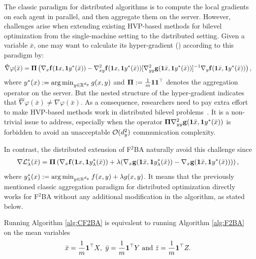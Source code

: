 The classic paradigm for distributed algorithms is to compute the local gradients on each agent in parallel, and then aggregate them on the server. 
However, challenges arise when extending existing HVP-based methods for bilevel optimization from the single-machine setting to the distributed setting. Given a variable $\bar x$, one may want to calculate its hyper-gradient () according to this paradigm by:
\begin{align*}
    \hat \nabla \varphi(\bar x) = {\bf \Pi} \left( \nabla_x {\bf{f}}({\bf{1}} x, {\bf{1}} y^*(\bar x)) - \nabla_{xy}^2 {\bf{f}}({\bf{1}} x,{\bf{1}} y^*(\bar x)) [\nabla_{yy}^2 {\bf{g}}({\bf{1}} \bar x, {\bf{1}} y^*(\bar x))]^{-1} \nabla_y {\bf{f}}({\bf{1}} \bar x, {\bf{1}} y^*(\bar x))  \right),
\end{align*}
where $y^*(x) := \arg \min_{y \in {\mathbb{R}}^{d_y}} g(x,y)$ and ${\bf \Pi} := \frac{1}{m} {\bf{1}} {\bf{1}}^\top$ denotes the aggregation operator on the server. 
But the nested structure of the hyper-gradient indicates that $ \hat \nabla \varphi(\bar x) \ne \nabla \varphi(\bar x)$. As a consequence, 
researchers need to pay extra effort to make HVP-based methods work in distributed bilevel problems~\citep{tarzanagh2022fednest,chen2022decentralized}.
It is a non-trivial issue to address, especially when the operator $ {\bf \Pi} \nabla_{yy}^2 {\bf{g}}({\bf{1}} \bar x,{\bf{1}} y^*(\bar x)) $ is forbidden to avoid an unacceptable ${\mathcal{O}}(d_y^2)$ communication complexity.

In contrast, the distributed extension of F${}^2$BA naturally avoid this challenge since
\begin{align*}
    \nabla {\mathcal{L}}_{\lambda}^*(\bar x) = {\bf \Pi} \left( \nabla_x {\bf{f}}({\bf{1}} x,{\bf{1}} y_{\lambda}^*(\bar x)) + \lambda (\nabla_x {\bf{g}}({\bf{1}} \bar x, {\bf{1}} y_{\lambda}^*(\bar x) ) - \nabla_x {\bf{g}} ({\bf{1}} \bar x, {\bf{1}} y^*(\bar x)) ) \right),
\end{align*}
where $y_{\lambda}^*(x) := \arg \min_{y \in {\mathbb{R}}^{d_y}} f(x,y) + \lambda g(x,y)$. It means that the previously mentioned classic aggregation paradigm for distributed optimization directly works for F${}^2$BA without any additional modification in the algorithm, as stated below.

\begin{prop} 
Running Algorithm \ref{alg:CF2BA} is equivalent to running  Algorithm \ref{alg:F2BA}  on the mean variables
\begin{align*}
    \bar x = \frac{1}{m} {\bf{1}}^\top X,~ \bar y = \frac{1}{m} {\bf{1}}^\top Y ~{\rm and}~ \bar z = \frac{1}{m} {\bf{1}}^\top Z.
\end{align*}
\end{prop}


